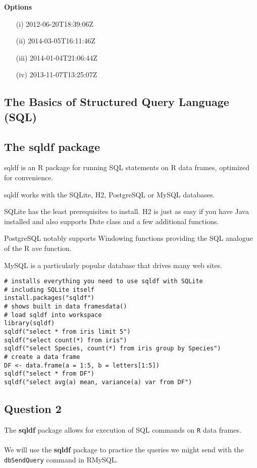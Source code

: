 \documentclass[12pt]{article}
\begin{document}
\noindent \textbf{Options} \\
\begin{itemize}
\item[(i)] 2012-06-20T18:39:06Z
\item[(ii)] 2014-03-05T16:11:46Z
\item[(iii)] 2014-01-04T21:06:44Z
\item[(iv)] 2013-11-07T13:25:07Z
\end{itemize}
\newpage
\subsection*{The Basics of Structured Query Language (SQL)}
\newpage
\subsection*{The sqldf package}
sqldf is an R package for running SQL statements on R data frames, optimized for convenience. 

sqldf works with the SQLite, H2, PostgreSQL or MySQL databases. 

SQLite has the least prerequisites to install. H2 is just as easy if you have Java installed and also supports Date class and a few additional functions. 

PostgreSQL notably supports Windowing functions providing the SQL analogue of the R ave function. 

MySQL is a particularly popular database that drives many web sites. 

\begin{framed}
\begin{verbatim}
# installs everything you need to use sqldf with SQLite
# including SQLite itself
install.packages("sqldf")
# shows built in data framesdata() 
# load sqldf into workspace
library(sqldf)
sqldf("select * from iris limit 5")
sqldf("select count(*) from iris")
sqldf("select Species, count(*) from iris group by Species")
# create a data frame
DF <- data.frame(a = 1:5, b = letters[1:5])
sqldf("select * from DF")
sqldf("select avg(a) mean, variance(a) var from DF")
\end{verbatim}
\end{framed}
\newpage
\subsection*{Question 2}
The \textbf{sqldf} package allows for execution of SQL commands on \texttt{R} data frames. \\\\ \noindent We will use the \textbf{sqldf} package to practice the queries we might send with the \texttt{dbSendQuery} command in RMySQL. 
\end{document}
